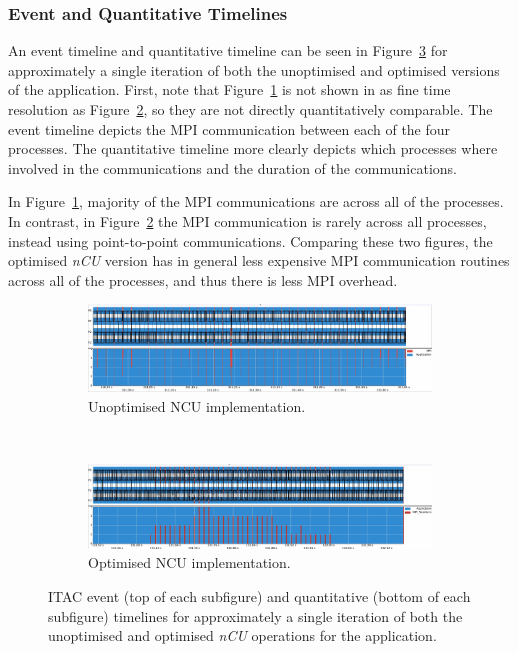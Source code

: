 \subsubsection{Event and Quantitative Timelines}
An event timeline and quantitative timeline can be seen in Figure~\ref{fig:itac_comms_bar} for approximately a single iteration of both the unoptimised and optimised versions of the application. First, note that Figure~\ref{fig:itac_mpi_comms_unopt_ncu} is not shown in as fine time resolution as Figure~\ref{fig:itac_mpi_comms_opt_ncu}, so they are not directly quantitatively comparable. The event timeline depicts the MPI communication between each of the four processes. The quantitative timeline more clearly depicts which processes where involved in the communications and the duration of the communications. 

In Figure~\ref{fig:itac_mpi_comms_unopt_ncu}, majority of the MPI communications are across all of the processes. In contrast, in Figure~\ref{fig:itac_mpi_comms_opt_ncu} the MPI communication is rarely across all processes, instead using point-to-point communications. Comparing these two figures, the optimised \textit{nCU} version has in general less expensive MPI communication routines across all of the processes, and thus there is less MPI overhead.

\begin{figure}[H]%
    \centering
    \begin{subfigure}{1.\linewidth}
        \centering
        \includegraphics[width=1.\linewidth]{Images/App_iteration/orig_single_iteration.png}
		\caption{Unoptimised NCU implementation.}
        \label{fig:itac_mpi_comms_unopt_ncu}
    \end{subfigure}\\
    \begin{subfigure}{1.\linewidth}
        \centering
        \includegraphics[width=1.\linewidth]{Images/App_iteration/ncu_single_iteration.png}
		\caption{Optimised NCU implementation.}
        \label{fig:itac_mpi_comms_opt_ncu}
    \end{subfigure}
    \caption{ITAC event (top of each subfigure) and quantitative (bottom of each subfigure) timelines for approximately a single iteration of both the unoptimised and optimised \textit{nCU} operations for the application.}
        \label{fig:itac_comms_bar}
\end{figure}

